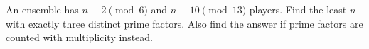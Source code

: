 An ensemble has $n\equiv2\pmod6$ and $n\equiv10\pmod{13}$ players. Find the least $n$ with exactly three distinct prime factors. Also find the answer if prime factors are counted with multiplicity instead.
